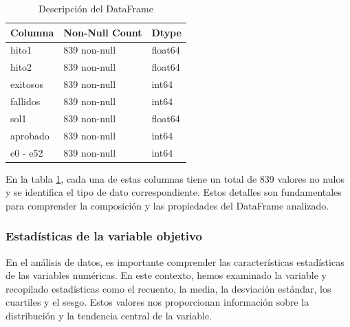 \begin{table}[H]
    \centering
    \caption{Descripción del DataFrame}
    \begin{tabular}{lll}
        \hline
        \textbf{Columna} & \textbf{Non-Null Count} & \textbf{Dtype} \\
        \hline
        hito1            & 839 non-null            & float64        \\
        hito2            & 839 non-null            & float64        \\
        exitosos         & 839 non-null            & int64          \\
        fallidos         & 839 non-null            & int64          \\
        sol1             & 839 non-null            & float64        \\
        aprobado         & 839 non-null            & int64          \\
        e0 - e52         & 839 non-null            & int64          \\
        \hline
    \end{tabular}%
    \label{tab:descripcion_dataframe}%
\end{table}%

En la tabla \ref{tab:descripcion_dataframe}, cada una de estas columnas tiene un total de 839 valores no nulos y se identifica el tipo de dato correspondiente. Estos detalles son fundamentales para comprender la composición y las propiedades del DataFrame analizado.

\subsubsection{Estadísticas de la variable objetivo}

En el análisis de datos, es importante comprender las características estadísticas de las variables numéricas. En este contexto, hemos examinado la variable  y recopilado estadísticas como el recuento, la media, la desviación estándar, los cuartiles y el sesgo. Estos valores nos proporcionan información sobre la distribución y la tendencia central de la variable.

